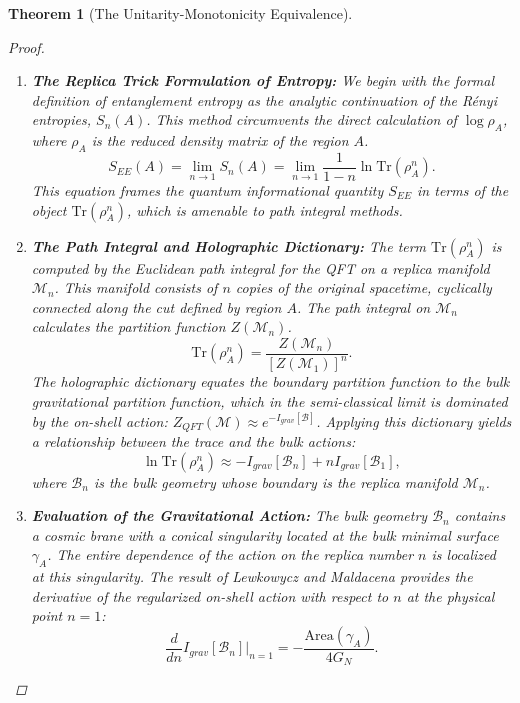 \documentclass[11pt, letterpaper]{report}
\theoremstyle{plain} %
\newtheorem{theorem}{Theorem}[chapter]
\theoremstyle{definition} %
\theoremstyle{remark} %
\begin{document}
\begin{theorem}[The Unitarity-Monotonicity Equivalence]
\begin{proof}
\begin{enumerate}
    \item \textbf{The Replica Trick Formulation of Entropy:} We begin with the formal definition of entanglement entropy as the analytic continuation of the Rényi entropies, $S_n(A)$. This method circumvents the direct calculation of $\log\rho_A$, where $\rho_A$ is the reduced density matrix of the region $A$.
    \begin{equation}
        S_{EE}(A) = \lim_{n \to 1} S_n(A) = \lim_{n \to 1} \frac{1}{1-n} \ln \text{Tr}(\rho_A^n).
        \label{eq:replica_trick_definition}
    \end{equation}
    This equation frames the quantum informational quantity $S_{EE}$ in terms of the object $\text{Tr}(\rho_A^n)$, which is amenable to path integral methods.

    \item \textbf{The Path Integral and Holographic Dictionary:} The term $\text{Tr}(\rho_A^n)$ is computed by the Euclidean path integral for the QFT on a replica manifold $\mathcal{M}_n$. This manifold consists of $n$ copies of the original spacetime, cyclically connected along the cut defined by region $A$. The path integral on $\mathcal{M}_n$ calculates the partition function $Z(\mathcal{M}_n)$.
    \begin{equation}
        \text{Tr}(\rho_A^n) = \frac{Z(\mathcal{M}_n)}{[Z(\mathcal{M}_1)]^n}.
    \end{equation}
    The holographic dictionary equates the boundary partition function to the bulk gravitational partition function, which in the semi-classical limit is dominated by the on-shell action: $Z_{QFT}(\mathcal{M}) \approx e^{-I_{grav}[\mathcal{B}]}$. Applying this dictionary yields a relationship between the trace and the bulk actions:
    \begin{equation}
        \ln \text{Tr}(\rho_A^n) \approx -I_{grav}[\mathcal{B}_n] + n I_{grav}[\mathcal{B}_1],
        \label{eq:ln_trace_action_diff_final}
    \end{equation}
    where $\mathcal{B}_n$ is the bulk geometry whose boundary is the replica manifold $\mathcal{M}_n$.

    \item \textbf{Evaluation of the Gravitational Action:} The bulk geometry $\mathcal{B}_n$ contains a cosmic brane with a conical singularity located at the bulk minimal surface $\gamma_A$. The entire dependence of the action on the replica number $n$ is localized at this singularity. The result of Lewkowycz and Maldacena \cite{Lewkowycz2013} provides the derivative of the regularized on-shell action with respect to $n$ at the physical point $n=1$:
    \begin{equation}
        \frac{d}{dn} I_{grav}[\mathcal{B}_n] \bigg|_{n=1} = -\frac{\text{Area}(\gamma_A)}{4G_N}.
    \end{equation}


\end{enumerate}
\end{proof}
\end{theorem}
\end{document}
